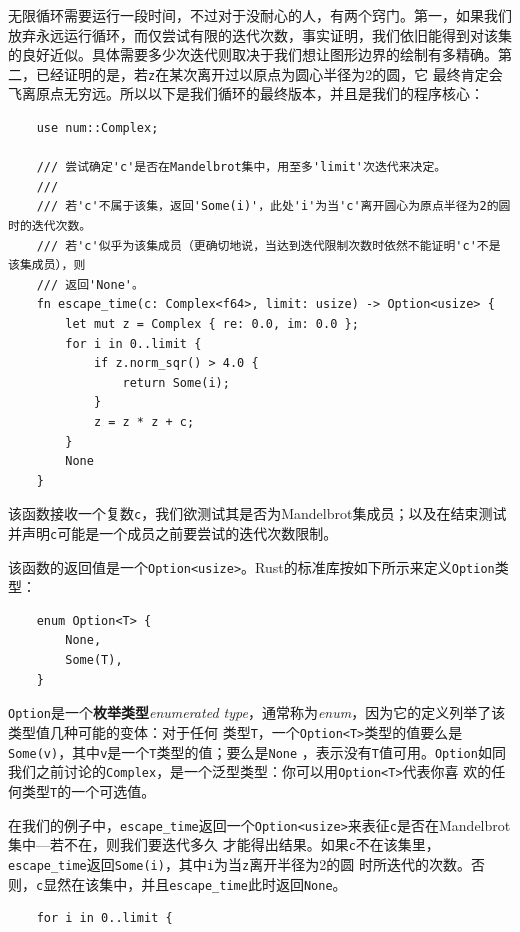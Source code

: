 \medskip
无限循环需要运行一段时间，不过对于没耐心的人，有两个窍门。第一，如果我们放弃永远运行循环，而仅尝试有限的迭代次数，事实证明，我们依旧能得到对该集
的良好近似。具体需要多少次迭代则取决于我们想让图形边界的绘制有多精确。第二，已经证明的是，若\texttt{z}在某次离开过以原点为圆心半径为2的圆，它
最终肯定会飞离原点无穷远。所以以下是我们循环的最终版本，并且是我们的程序核心：
\begin{verbatim}
    use num::Complex;

    /// 尝试确定'c'是否在Mandelbrot集中，用至多'limit'次迭代来决定。
    /// 
    /// 若'c'不属于该集，返回'Some(i)'，此处'i'为当'c'离开圆心为原点半径为2的圆时的迭代次数。
    /// 若'c'似乎为该集成员（更确切地说，当达到迭代限制次数时依然不能证明'c'不是该集成员），则
    /// 返回'None'。
    fn escape_time(c: Complex<f64>, limit: usize) -> Option<usize> {
        let mut z = Complex { re: 0.0, im: 0.0 };
        for i in 0..limit {
            if z.norm_sqr() > 4.0 {
                return Some(i);
            }
            z = z * z + c;
        }
        None
    }
\end{verbatim}

\smallskip
该函数接收一个复数\texttt{c}，我们欲测试其是否为Mandelbrot集成员；以及在结束测试并声明\texttt{c}可能是一个成员之前要尝试的迭代次数限制。

\medskip
该函数的返回值是一个\texttt{Option<usize>}。Rust的标准库按如下所示来定义\texttt{Option}类型：
\begin{verbatim}
    enum Option<T> {
        None,
        Some(T),
    }
\end{verbatim}

\smallskip
\texttt{Option}是一个\textbf{枚举类型}\textit{enumerated type}，通常称为\textit{enum}，因为它的定义列举了该类型值几种可能的变体：对于任何
类型\texttt{T}，一个\texttt{Option<T>}类型的值要么是\texttt{Some(v)}，其中\texttt{v}是一个\texttt{T}类型的值；要么是\texttt{None}
，表示没有\texttt{T}值可用。\texttt{Option}如同我们之前讨论的\texttt{Complex}，是一个泛型类型：你可以用\texttt{Option<T>}代表你喜
欢的任何类型\texttt{T}的一个可选值。

\medskip
在我们的例子中，\texttt{escape\_time}返回一个\texttt{Option<usize>}来表征\texttt{c}是否在Mandelbrot集中---若不在，则我们要迭代多久
才能得出结果。如果\texttt{c}不在该集里，\texttt{escape\_time}返回\texttt{Some(i)}，其中\texttt{i}为当\texttt{z}离开半径为2的圆
时所迭代的次数。否则，\texttt{c}显然在该集中，并且\texttt{escape\_time}此时返回\texttt{None}。
\begin{verbatim}
    for i in 0..limit {
\end{verbatim}

